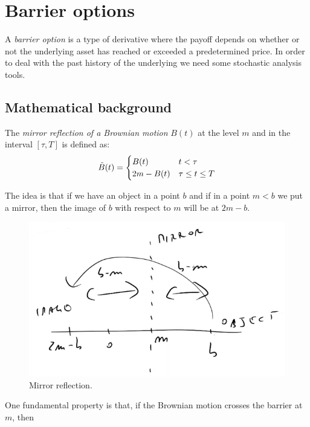 \section{Barrier options}
A \emph{barrier option} is a type of derivative where the payoff depends on whether or not the underlying asset has reached or exceeded a predetermined price. In order to deal with the past history of the underlying we need some stochastic analysis tools.

\subsection{Mathematical background}
\begin{definition}
The \emph{mirror reflection of a Brownian motion} $B(t)$ at the level $m$ and in the interval $[\tau,T]$ is defined as:
    \begin{equation}
        \Tilde{B}(t) = \begin{cases}
            B(t) & t<\tau \\
            2m - B(t) & \tau \le t\le T
        \end{cases}
    \end{equation}
\end{definition}
The idea is that if we have an object in a point $b$ and if in a point $m<b$ we put a mirror, then the image of $b$ with respect to $m$ will be at $2m-b$.
\begin{figure}[h]
    \centering
    \includegraphics[scale=0.3]{fig/tmp/fig33.png}
    \caption{Mirror reflection.}
    \label{fig:mirro}
\end{figure}
\newline One fundamental property is that, if the Brownian motion crosses the barrier at $m$, then
